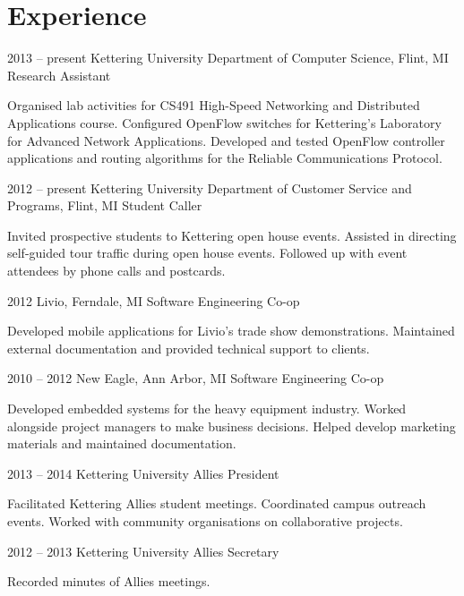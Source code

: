 \documentclass[12pt]{actccv/actccv}
\begin{document}
\address{PO Box 320426, Flint, MI 48532}

\maketitle

\section{Experience}

\begin{eventlist}
\item{2013 -- present}
     {Kettering University Department of Computer Science, Flint, MI}
     {Research Assistant}
     
     Organised lab activities for CS491 High-Speed Networking and 
     Distributed Applications course. Configured OpenFlow switches 
     for Kettering's Laboratory for Advanced Network Applications.
     Developed and tested OpenFlow controller applications and routing algorithms 
     for the Reliable Communications Protocol.

\item{2012 -- present}
     {Kettering University Department of Customer Service and Programs, Flint, MI}
     {Student Caller}
     
     Invited prospective students to Kettering open house events.
     Assisted in directing self-guided tour traffic during open house events.
     Followed up with event attendees by phone calls and postcards.
     
\item{2012}
     {Livio, Ferndale, MI}
     {Software Engineering Co-op}
     
     Developed mobile applications for Livio's trade show demonstrations.
     Maintained external documentation and provided technical support 
     to clients.
     
\item{2010 -- 2012}
     {New Eagle, Ann Arbor, MI}
     {Software Engineering Co-op}
     
     Developed embedded systems for the heavy equipment industry. 
     Worked alongside project managers to make business decisions. 
     Helped develop marketing materials and maintained documentation.
     
\item{2013 -- 2014}
     {Kettering University Allies}
     {President}
     
     Facilitated Kettering Allies student meetings. 
     Coordinated campus outreach events. 
     Worked with community organisations on collaborative projects.
     
\item{2012 -- 2013}
     {Kettering University Allies}
     {Secretary}
     
     Recorded minutes of Allies meetings. 
     
     
\end{eventlist}
\end{document}
